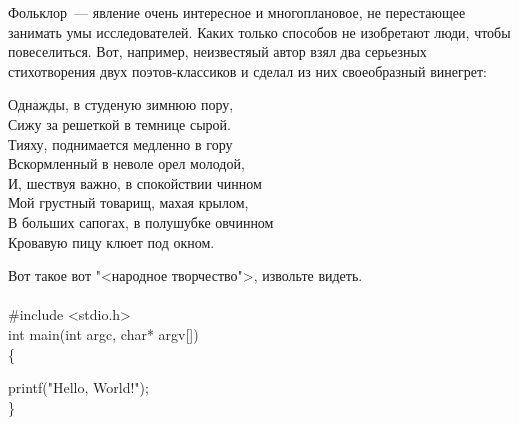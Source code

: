 \documentclass[12pt]{article}
\begin{document}
Фольклор~--- явление очень интересное и многоплановое, не
перестающее занимать умы исследователей. Каких только
способов не изобретают люди, чтобы повеселиться. Вот,
например, неизвестяый автор взял два серьезных стихотворения
двух поэтов-классиков и сделал из них своеобразный винегрет:

\bigskip
\noindent Однажды, в студеную зимнюю пору, \\
Сижу за решеткой в темнице сырой.\\
Тияху, поднимается медленно в гору\\
Вскормленный в неволе орел молодой,\\
И, шествуя важно, в спокойствии чинном\\
Мой грустный товарищ, махая крылом,\\
В больших сапогах, в полушубке овчинном\\
Кровавую пицу клюет под окном.
\bigskip

Вот такое вот "<народное творчество">, извольте видеть.\\\\
\#include <stdio.h> \\
int main(int argc, char* argv[])\\
\{ \par
 printf("Hello, World!");\\
\} \\
\end{document}
